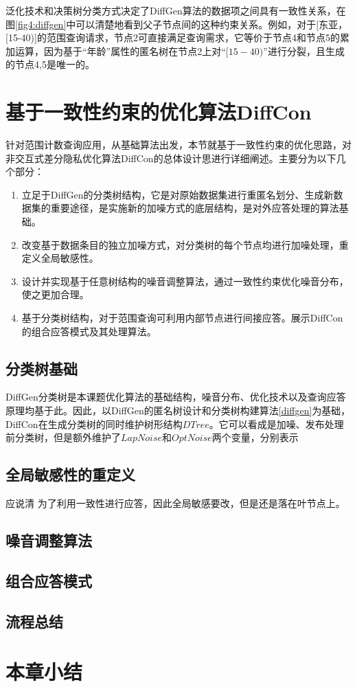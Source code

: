 泛化技术和决策树分类方式决定了DiffGen算法的数据项之间具有一致性关系，在图\ref{fig4:diffgen}中可以清楚地看到父子节点间的这种约束关系。例如，对于[东亚，[15-40)]的范围查询请求，节点2可直接满足查询需求，它等价于节点4和节点5的累加运算，因为基于“年龄”属性的匿名树在节点2上对“$[15-40)$”进行分裂，且生成的节点4,5是唯一的。


\section{基于一致性约束的优化算法DiffCon}

针对范围计数查询应用，从基础算法出发，本节就基于一致性约束的优化思路，对非交互式差分隐私优化算法DiffCon的总体设计思进行详细阐述。主要分为以下几个部分：
\begin{enumerate}
	\item 立足于DiffGen的分类树结构，它是对原始数据集进行重匿名划分、生成新数据集的重要途径，是实施新的加噪方式的底层结构，是对外应答处理的算法基础。
	\item 改变基于数据条目的独立加噪方式，对分类树的每个节点均进行加噪处理，重定义全局敏感性。
	\item 设计并实现基于任意树结构的噪音调整算法，通过一致性约束优化噪音分布，使之更加合理。
	\item 基于分类树结构，对于范围查询可利用内部节点进行间接应答。展示DiffCon的组合应答模式及其处理算法。
\end{enumerate}

\subsection{分类树基础}

DiffGen分类树是本课题优化算法的基础结构，噪音分布、优化技术以及查询应答原理均基于此。因此，以DiffGen的匿名树设计和分类树构建算法\ref{diffgen}为基础，DiffCon在生成分类树的同时维护树形结构$DTree$。它可以看成是加噪、发布处理前分类树，但是额外维护了$LapNoise$和$OptNoise$两个变量，分别表示


\subsection{全局敏感性的重定义}

应说清 为了利用一致性进行应答，因此全局敏感要改，但是还是落在叶节点上。

\subsection{噪音调整算法}

\subsection{组合应答模式}

\subsection{流程总结}

\section{本章小结}